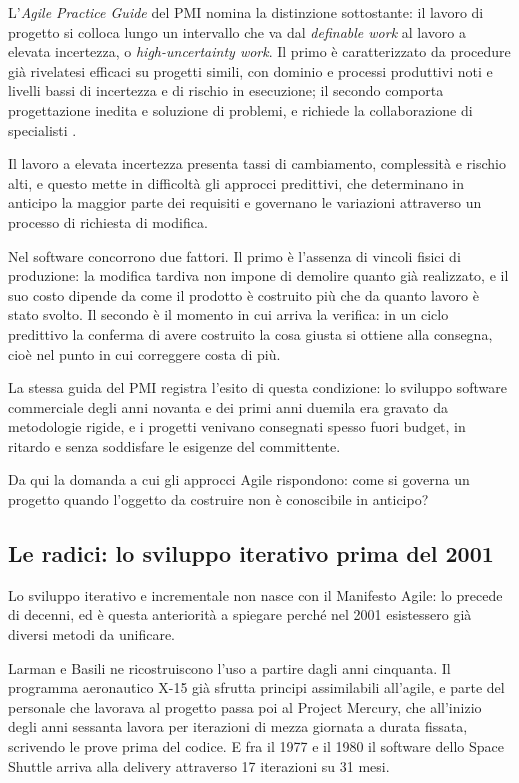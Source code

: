 L'\emph{Agile Practice Guide} del PMI nomina la distinzione sottostante: il
lavoro di progetto si colloca lungo un intervallo che va dal \emph{definable
work} al lavoro a elevata incertezza, o \emph{high-uncertainty work}. Il primo
\`e caratterizzato da procedure gi\`a rivelatesi efficaci su progetti simili,
con dominio e processi produttivi noti e livelli bassi di incertezza e di
rischio in esecuzione; il secondo comporta progettazione inedita e
soluzione di problemi, e richiede la collaborazione di specialisti
\cite{agilepracticeguide2}.

Il lavoro a elevata incertezza presenta tassi di cambiamento, complessit\`a e
rischio alti, e questo mette in difficolt\`a gli approcci predittivi, che
determinano in anticipo la maggior parte dei requisiti e governano le variazioni
attraverso un processo di richiesta di modifica.

Nel software concorrono due fattori. Il primo \`e l'assenza di vincoli fisici di
produzione: la modifica tardiva non impone di demolire quanto gi\`a realizzato,
e il suo costo dipende da come il prodotto \`e costruito pi\`u che da quanto
lavoro \`e stato svolto.
Il secondo \`e il momento in cui arriva la verifica: in un ciclo predittivo la conferma di
avere costruito la cosa giusta si ottiene alla consegna, cio\`e nel punto in cui
correggere costa di pi\`u.

La stessa guida del PMI registra l'esito di questa condizione: lo sviluppo
software commerciale degli anni novanta e dei primi anni duemila era gravato da
metodologie rigide, e i progetti venivano consegnati spesso fuori budget,
in ritardo e senza soddisfare le esigenze del committente.

Da qui la domanda a cui gli approcci Agile rispondono: come si governa un
progetto quando l'oggetto da costruire non \`e conoscibile in anticipo?

\subsection{Le radici: lo sviluppo iterativo prima del 2001}

Lo sviluppo iterativo e incrementale non nasce con il Manifesto Agile: lo
precede di decenni, ed \`e questa anteriorit\`a a spiegare perch\'e nel 2001
esistessero gi\`a diversi metodi da unificare.

Larman e Basili ne ricostruiscono l'uso a partire dagli anni cinquanta.
Il programma aeronautico X-15 gi\`a sfrutta principi assimilabili all'agile, e
parte del personale che lavorava al progetto passa poi al Project Mercury, che all'inizio
degli anni sessanta lavora per iterazioni di mezza giornata a durata fissata,
scrivendo le prove prima del codice. E fra il 1977 e il 1980 il software
dello Space Shuttle arriva alla delivery attraverso 17 iterazioni su 31 mesi.

